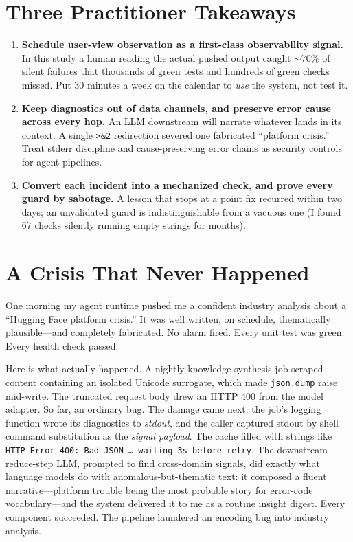 \documentclass[10pt,journal]{IEEEtran}
\begin{document}
\section*{Three Practitioner Takeaways}
\begin{enumerate}
\item \textbf{Schedule user-view observation as a first-class observability
signal.} In this study a human reading the actual pushed output caught
$\sim$70\% of silent failures that thousands of green tests and hundreds of
green checks missed. Put 30 minutes a week on the calendar to \emph{use} the
system, not test it.
\item \textbf{Keep diagnostics out of data channels, and preserve error cause
across every hop.} An LLM downstream will narrate whatever lands in its
context. A single \texttt{>\&2} redirection severed one fabricated ``platform
crisis.'' Treat stderr discipline and cause-preserving error chains as
security controls for agent pipelines.
\item \textbf{Convert each incident into a mechanized check, and prove every
guard by sabotage.} A lesson that stops at a point fix recurred within two
days; an unvalidated guard is indistinguishable from a vacuous one (I found
67 checks silently running empty strings for months).
\end{enumerate}

\section{A Crisis That Never Happened}
One morning my agent runtime pushed me a confident industry analysis about a
``Hugging Face platform crisis.'' It was well written, on schedule,
thematically plausible---and completely fabricated. No alarm fired. Every unit
test was green. Every health check passed.

Here is what actually happened. A nightly knowledge-synthesis job scraped
content containing an isolated Unicode surrogate, which made
\texttt{json.dump} raise mid-write. The truncated request body drew an HTTP
400 from the model adapter. So far, an ordinary bug. The damage came next: the
job's logging function wrote its diagnostics to \emph{stdout}, and the caller
captured stdout by shell command substitution as the \emph{signal payload}.
The cache filled with strings like \texttt{HTTP Error 400: Bad JSON \ldots
waiting 3s before retry}. The downstream reduce-step LLM, prompted to find
cross-domain signals, did exactly what language models do with
anomalous-but-thematic text: it composed a fluent narrative---platform trouble
being the most probable story for error-code vocabulary---and the system
delivered it to me as a routine insight digest. Every component succeeded. The
pipeline laundered an encoding bug into industry analysis.
\end{document}
